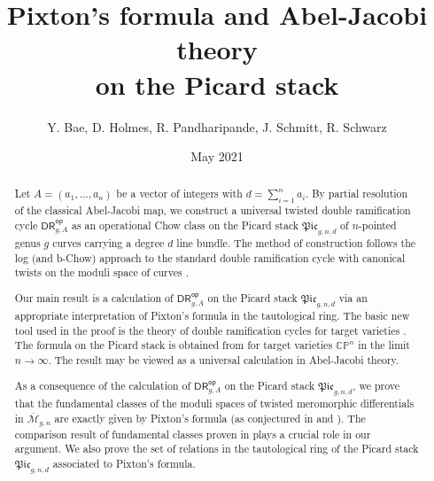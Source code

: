 \documentclass[a4paper,12pt]{article} %
\title{Pixton's formula and Abel-Jacobi theory \\on the Picard stack}
\author{Y. Bae, D. Holmes, R. Pandharipande, J. Schmitt, R. Schwarz}
\date{May 2021}
\newcommand{\on}[1]{\operatorname{#1}}
\newcommand{\bb}[1]{{\mathbb{#1}}}
\newcommand{\ca}[1]{{\mathcal{#1}}}
\newcommand{\bd}[1]{{\mathbf{#1}}}
\def\virt{\mathrm{vir}}
\def\DR{\mathsf{DR}}
\def\CP{{{\mathbb {CP}}}}
\def\cO{\mathcal{O}}
\def\oM{\overline{\mathcal{M}}}
\def\cM{{\mathcal{M}}}
\def\C{{\mathcal{C}}}
\def\C{\mathbb{C}}
\theoremstyle{definition}
\theoremstyle{plain}%
\newcommand{\Picabs}{\mathfrak{Pic}}
\renewcommand{\k}{k}
\begin{document}
\maketitle
\begin{abstract} 
Let $A=(a_1,\ldots,a_n)$ be a vector of integers with $d=\sum_{i=1}^n a_i$.
By partial resolution of the classical Abel-Jacobi map, we construct a universal
twisted double ramification cycle $\mathsf{DR}^{\mathsf{op}}_{g,A}$ as an operational Chow class
on the Picard stack $\Picabs_{g,n,d}$
of $n$-pointed genus $g$ curves carrying a degree $d$ line bundle. The method of construction
follows the log (and b-Chow) approach to the standard
double ramification cycle with canonical twists on the moduli space of curves \cite{Holmes2017Extending-the-d, Holmes2017Multiplicativit, Marcus2017Logarithmic-com}.



Our main result is a calculation of $\mathsf{DR}^{\mathsf{op}}_{g,A}$ on 
the Picard stack $\Picabs_{g,n,d}$
via an appropriate interpretation of Pixton's formula in the tautological ring. The basic
new tool used in the
proof is the theory of double ramification cycles for target varieties \cite{Janda2018Double-ramifica}.
The formula on the Picard stack is obtained from \cite{Janda2018Double-ramifica} for
target varieties $\mathbb{CP}^n$ in
the limit $n\rightarrow \infty$. The result may be viewed as a
universal calculation in Abel-Jacobi theory.

As a consequence of the calculation of  $\mathsf{DR}^{\mathsf{op}}_{g,A}$ on the Picard stack
$\Picabs_{g,n,d}$, we prove that
the fundamental classes of the moduli spaces of twisted meromorphic differentials
in $\overline{\mathcal{M}}_{g,n}$
are exactly given by Pixton's formula (as conjectured in \cite[Appendix]{Farkas2016The-moduli-spac} and \cite{Schmitt2016Dimension-theor}).
The comparison result  of fundamental classes proven in \cite{Holmes2019Infinitesimal-s} plays a crucial
role in our argument. 
We also prove the set of relations in the
tautological ring of the Picard stack $\Picabs_{g,n,d}$  associated
to Pixton's formula.


\end{abstract}



\tableofcontents

\newcommand{\Mtildes}{ \widetilde{\ca M}^\Sigma}
\newcommand{\sch}[1]{\textcolor{blue}{#1}}

\newcommand{\Mbar}{\overline{\ca M}}
\newcommand{\MD}{\ca M^\blacklozenge}
\newcommand{\Md}{\ca M^\lozenge}
\newcommand{\DRL}{\operatorname{DRL}}
\newcommand{\DRC}{\operatorname{DRC}}
\newcommand{\isom}{\stackrel{\sim}{\longrightarrow}}
\newcommand{\Ann}[1]{\on{Ann}(#1)}
\newcommand{\fm}{\mathfrak m}
\newcommand{\Mdk}{\Mbar^{\m, 1/\k}}
\newcommand{\field}{K}
\newcommand{\Mdm}{\Mbar^\m}
\newcommand{\m}{{\bd m}}
\newcommand{\cat}[1]{\mathbf{#1}}
\newcommand{\targetmap}{\ell}
\newcommand{\sourcemap}{\ell'}
\newcommand{\rel}{\mathsf{rel}}
\newcommand{\pre}{\mathsf{pre}}
\setcounter{section}{-1}
\end{document}
